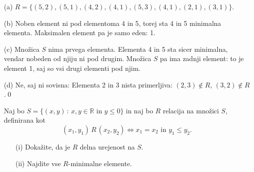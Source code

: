 \documentclass[11pt,paper=b5,footinclude,headinclude]{scrbook} %
\newtheorem{ex}{Vaja\hypertarget{sol:\theex}}[chapter]
\begin{document}
\begin{sol}
    
(a) $R = \{(5,2),(5,1),(4,2),(4,1),(5,3),(4,1),(2,1),(3,1)\}$.

(b) Noben element ni pod elementoma 4 in 5, torej sta 4 in 5 minimalna elementa.
Maksimalen element pa je samo eden: 1.

(c) Množica $S$ nima prvega elementa. Elementa 4 in 5 sta sicer minimalna, vendar nobeden
od njiju ni pod drugim. Množica $S$ pa ima zadnji element: to je element 1, saj so vsi drugi elementi
pod njim.

(d) Ne, saj ni sovisna: Elementa 2 in 3 nista primerljiva: $(2,3)\not\in R$, $(3,2)\not\in R$.\qed
\end{sol}


\begin{ex} Naj bo $S=\{ (x,y) \,:\, x, y\in\mathbb{R} \textrm{ in } y\leq 0 \}$ in naj bo $R$ relacija na množici $S$, definirana kot 
	$$(x_1,y_1)\, R\, (x_2,y_2) \Leftrightarrow  x_1 = x_2 \textrm{ in } y_1\leq y_2.$$
	\begin{enumerate}
		\item[(i)] Dokažite, da je $R$ delna urejenost na $S$.
		\item[(ii)] Najdite vse $R$-minimalne elemente.
	\end{enumerate}
	
	\end{ex} 
\end{document}
